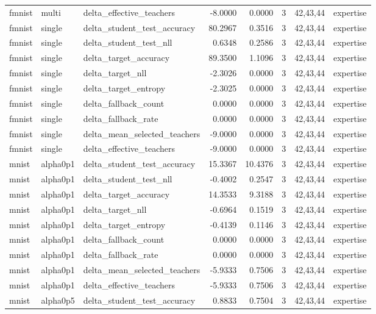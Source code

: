 \begin{tabular}{lllrrrll}
fmnist & multi & delta\_effective\_teachers & -8.0000 & 0.0000 & 3 & 42,43,44 & expertise \\
fmnist & single & delta\_student\_test\_accuracy & 80.2967 & 0.3516 & 3 & 42,43,44 & expertise \\
fmnist & single & delta\_student\_test\_nll & 0.6348 & 0.2586 & 3 & 42,43,44 & expertise \\
fmnist & single & delta\_target\_accuracy & 89.3500 & 1.1096 & 3 & 42,43,44 & expertise \\
fmnist & single & delta\_target\_nll & -2.3026 & 0.0000 & 3 & 42,43,44 & expertise \\
fmnist & single & delta\_target\_entropy & -2.3025 & 0.0000 & 3 & 42,43,44 & expertise \\
fmnist & single & delta\_fallback\_count & 0.0000 & 0.0000 & 3 & 42,43,44 & expertise \\
fmnist & single & delta\_fallback\_rate & 0.0000 & 0.0000 & 3 & 42,43,44 & expertise \\
fmnist & single & delta\_mean\_selected\_teachers & -9.0000 & 0.0000 & 3 & 42,43,44 & expertise \\
fmnist & single & delta\_effective\_teachers & -9.0000 & 0.0000 & 3 & 42,43,44 & expertise \\
mnist & alpha0p1 & delta\_student\_test\_accuracy & 15.3367 & 10.4376 & 3 & 42,43,44 & expertise \\
mnist & alpha0p1 & delta\_student\_test\_nll & -0.4002 & 0.2547 & 3 & 42,43,44 & expertise \\
mnist & alpha0p1 & delta\_target\_accuracy & 14.3533 & 9.3188 & 3 & 42,43,44 & expertise \\
mnist & alpha0p1 & delta\_target\_nll & -0.6964 & 0.1519 & 3 & 42,43,44 & expertise \\
mnist & alpha0p1 & delta\_target\_entropy & -0.4139 & 0.1146 & 3 & 42,43,44 & expertise \\
mnist & alpha0p1 & delta\_fallback\_count & 0.0000 & 0.0000 & 3 & 42,43,44 & expertise \\
mnist & alpha0p1 & delta\_fallback\_rate & 0.0000 & 0.0000 & 3 & 42,43,44 & expertise \\
mnist & alpha0p1 & delta\_mean\_selected\_teachers & -5.9333 & 0.7506 & 3 & 42,43,44 & expertise \\
mnist & alpha0p1 & delta\_effective\_teachers & -5.9333 & 0.7506 & 3 & 42,43,44 & expertise \\
mnist & alpha0p5 & delta\_student\_test\_accuracy & 0.8833 & 0.7504 & 3 & 42,43,44 & expertise \\

\end{tabular}
